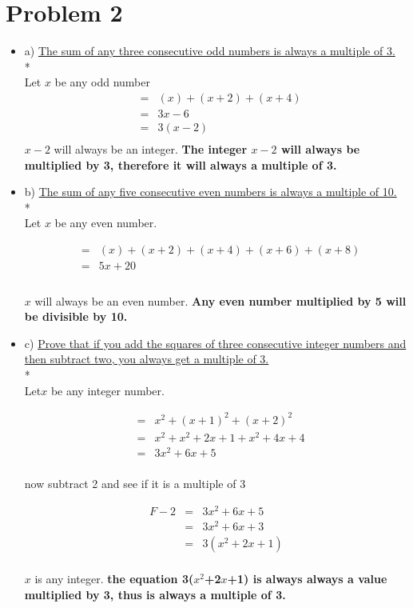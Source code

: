\documentclass[11pt]{article}
\begin{document}
	\section*{Problem 2}
	\begin{itemize}
	
	\item [] a)
	{\underline{The sum of any three consecutive odd numbers is always a multiple of 3.}}\\*\\
	
	Let $x$ be any odd number
	\begin{eqnarray*}
	&=& (x)+(x+2)+(x+4) \\ 
	&=& 3x-6\\
	&=& 3(x-2) \\
	\end{eqnarray*}
	$x-2$ will always be an integer. \textbf{The integer $x-2$ will always be multiplied by 3, therefore it will always a multiple of 3.}
	\newpage
	\item [] b)
	{\underline{The sum of any five consecutive even numbers is always a multiple of 10.}}\\*\\
	
	Let $x$ be any even number.
	
	\begin{eqnarray*}
	&=& (x)+(x+2)+(x+4)+(x+6)+(x+8)\\
	&=& 5x+20\\
	\end{eqnarray*}\\
	$x$ will always be an even number. \textbf{Any even number multiplied by 5 will be divisible by 10.}
	
	\item [] c)	
	{\underline{Prove that if you add the squares of three consecutive integer numbers and then subtract two, you always get a multiple of 3.}}\\*\\
	
	Let$x$ be any integer number.
	
	\begin{eqnarray*}
	&=& x^{2}+(x+1)^2+(x+2)^2\\
	&=& x^2+x^2+2x+1+x^2+4x+4 \\
	&=& 3x^2+6x+5\\
	\end{eqnarray*}
	
	now subtract 2 and see if it is a multiple of 3
	
	\begin{eqnarray*}
	F-2 &=& 3x^2+6x+5\\
	&=& 3x^2+6x+3\\
	&=& 3(x^2+2x+1)\\
	\end{eqnarray*}
	
	$x$ is any integer. \textbf{the equation 3($x^2$+2$x$+1) is always always a value multiplied by 3, thus is always a multiple of 3.}
	
	\end{itemize}
	
\end{document}
